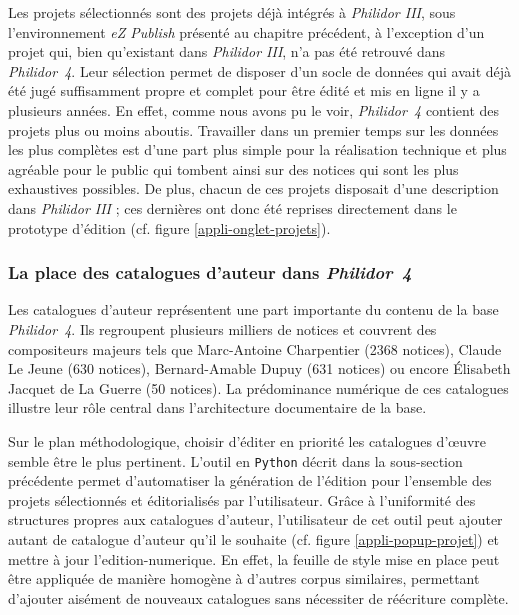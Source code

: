 Les projets sélectionnés sont des projets déjà intégrés à \textit{Philidor III}, sous l'environnement \textit{eZ Publish} présenté au chapitre précédent, à l'exception d'un projet qui, bien qu'existant dans \textit{Philidor III}, n'a pas été retrouvé dans \textit{Philidor~4}. Leur sélection permet de disposer d'un socle de données qui avait déjà été jugé suffisamment propre et complet pour être édité et mis en ligne il y a plusieurs années. En effet, comme nous avons pu le voir, \textit{Philidor~4} contient des projets plus ou moins aboutis. Travailler dans un premier temps sur les données les plus complètes est d'une part plus simple pour la réalisation technique et plus agréable pour le public qui tombent ainsi sur des notices qui sont les plus exhaustives possibles. De plus, chacun de ces projets disposait d'une description dans \textit{Philidor III} ; ces dernières ont donc été reprises directement dans le prototype d'édition (cf. figure \ref{appli-onglet-projets}).

\subsubsection{La place des catalogues d’auteur dans \textit{Philidor~4}}

Les catalogues d’auteur représentent une part importante du contenu de la base \textit{Philidor~4}. Ils regroupent plusieurs milliers de notices et couvrent des compositeurs majeurs tels que Marc-Antoine Charpentier (2368 notices), Claude Le Jeune (630 notices), Bernard-Amable Dupuy (631 notices) ou encore Élisabeth Jacquet de La Guerre (50 notices). La prédominance numérique de ces catalogues illustre leur rôle central dans l’architecture documentaire de la base.

Sur le plan méthodologique, choisir d'éditer en priorité les catalogues d'œuvre semble être le plus pertinent. L’outil en \texttt{Python} décrit dans la sous-section précédente permet d’automatiser la génération de l’édition pour l’ensemble des projets sélectionnés et éditorialisés par l'utilisateur. Grâce à l’uniformité des structures propres aux catalogues d’auteur, l'utilisateur de cet outil peut ajouter autant de catalogue d'auteur qu'il le souhaite (cf. figure \ref{appli-popup-projet}) et mettre à jour l'\gls{edition-numerique}. 
En effet, la feuille de style mise en place peut être appliquée de manière homogène à d’autres corpus similaires, permettant d’ajouter aisément de nouveaux catalogues sans nécessiter de réécriture complète.

